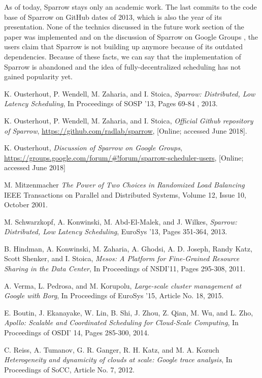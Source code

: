 \documentclass[11pt]{article}
\begin{document}
	As of today, Sparrow stays only an academic work. The last commits to the code base of Sparrow on GitHub dates of 2013, which is also the year of its presentation. None of the technics discussed in the future work section of the paper was implemented and on the discussion of Sparrow on Google Groups \cite{group}, the users claim that Sparrow is not building up anymore because of its outdated dependencies. Because of these facts, we can say that the implementation of Sparrow is abandoned and the idea of fully-decentralized scheduling has not gained popularity yet.
		




\begin{thebibliography}{9}

  K. Ousterhout, P. Wendell, M. Zaharia, and I. Stoica,
  \textit{Sparrow: Distributed, Low Latency Scheduling},
  In Proceedings of SOSP '13,
  Pages 69-84 ,
  2013.

  K. Ousterhout, P. Wendell, M. Zaharia, and I. Stoica,
  \textit{Official Github repository of Sparrow},
  \url{https://github.com/radlab/sparrow},
  [Online; accessed June 2018].
  
  K. Ousterhout,
  \textit{Discussion of Sparrow on Google Groups},
  \url{https://groups.google.com/forum/#!forum/sparrow-scheduler-users},
  [Online; accessed June 2018]

  M. Mitzenmacher
  \textit{The Power of Two Choices in Randomized Load Balancing}
  IEEE Transactions on Parallel and Distributed Systems,
  Volume 12,
  Issue 10,
  October 2001.

  M. Schwarzkopf, A. Konwinski, M. Abd-El-Malek, and J. Wilkes,
  \textit{Sparrow: Distributed, Low Latency Scheduling},
  EuroSys '13,
  Pages 351-364,
  2013.
  
  B. Hindman, A. Konwinski, M. Zaharia, A. Ghodsi, A. D. Joseph, Randy Katz, Scott Shenker, and I. Stoica,
  \textit{Mesos: A Platform for Fine-Grained Resource Sharing in the Data Center},
  In Proceedings of NSDI'11,
  Pages 295-308,
  2011.
  
  A. Verma, L. Pedrosa, and M. Korupolu,
  \textit{Large-scale cluster management at Google with Borg},
  In Proceedings of EuroSys '15,
  Article No. 18,
  2015.

  E. Boutin, J. Ekanayake, W. Lin, B. Shi, J. Zhou, Z. Qian, M. Wu, and L. Zho,
  \textit{Apollo: Scalable and Coordinated Scheduling for Cloud-Scale Computing},
  In Proceedings of OSDI' 14,
  Pages 285-300,
  2014.
  
  C. Reiss, A. Tumanov, G. R. Ganger, R. H. Katz, and M. A. Kozuch
  \textit{Heterogeneity and dynamicity of clouds at scale: Google trace analysis},
  In Proceedings of SoCC,
  Article No. 7,
  2012.


\end{thebibliography}
\end{document}
